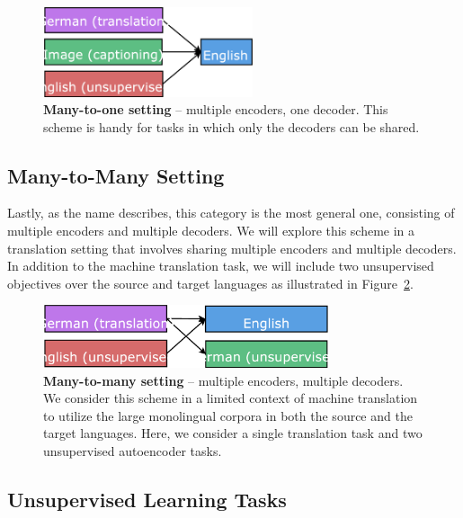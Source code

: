\begin{figure}[tbh]
\centering
\includegraphics[width=0.55\textwidth, clip=true, trim= 0 0 0
0]{img/6-1_mto}
\caption{{\bf Many-to-one setting} -- multiple encoders, one decoder. This scheme
is handy for tasks in which only the decoders can be shared.}
\label{f:mto}
\end{figure}

\subsection{Many-to-Many Setting}
\label{subsec:mtm}
Lastly, as the name describes, this category is the most general one,
consisting of multiple encoders and multiple decoders.
We will explore this scheme in a translation setting that involves sharing multiple
encoders and multiple decoders.  In addition to the machine
translation task, we will include two unsupervised 
objectives over the source and target languages as illustrated in
Figure~\ref{f:mtm}.

\begin{figure}
\centering
\includegraphics[width=0.75\textwidth, clip=true, trim= 0 0 0
0]{img/6-1_mtm}
\caption{{\bf Many-to-many setting} -- multiple encoders, multiple decoders. We
consider this scheme in a limited context of machine translation to utilize the large
monolingual corpora in both the source and the target languages. Here, we
consider a single translation task and two unsupervised autoencoder tasks.} 
\label{f:mtm}
\end{figure}

\subsection{Unsupervised Learning Tasks}

